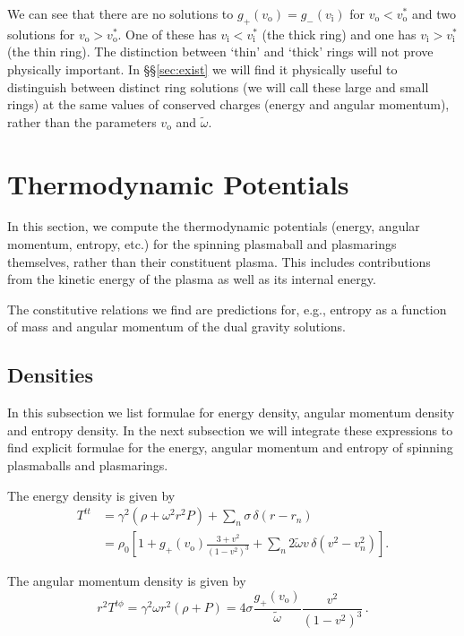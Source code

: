 \documentclass[12pt,a4paper]{article}
\newcommand{\prn}[1]{\left ( #1 \right )}
\newcommand{\brk}[1]{\left [ #1 \right ]}
\newcommand{\rz}{\rho_0}
\newcommand{\vi}{v_\mathrm{i}}
\newcommand{\vo}{v_\mathrm{o}}
\newcommand{\tw}{\widetilde{\omega}}
\begin{document}
We can see that there are no solutions to $g_+(\vo)=g_-(\vi)$ for
$\vo<\vo^*$ and two solutions for $\vo>\vo^*$. One of these has
$\vi<\vi^*$ (the thick ring) and one has $\vi>\vi^*$ (the thin
ring). The distinction between `thin' and `thick' rings will not
prove physically important. In \S\S\ref{sec:exist} we will find it
physically useful to distinguish between distinct ring solutions (we
will call these large and small rings) at the same values of
conserved charges (energy and angular momentum), rather than the
parameters $\vo$ and $\tw$.






\section{Thermodynamic Potentials}\label{sec:charges}

In this section, we compute the thermodynamic potentials (energy,
angular momentum, entropy, etc.) for the spinning plasmaball and
plasmarings themselves, rather than their constituent plasma. This
includes contributions from the kinetic energy of the plasma as well
as its internal energy.

The constitutive relations we find  are predictions for, e.g.,
entropy as a function of mass and angular momentum of the dual
gravity solutions.

\subsection{Densities}\label{sec:chdens}

In this subsection we list formulae for energy density, angular
momentum density and entropy density. In the next subsection we will
integrate these expressions to find explicit formulae for the
energy, angular momentum and entropy of spinning plasmaballs and
plasmarings.

The energy density is given by
%
\begin{equation}\label{Edens:eq}
\begin{split}
  T^{tt} &= \gamma^2 \prn{\rho+\omega^2r^2P}
              + \sum_n \sigma\, \delta(r-r_n) \\
     &= \rz \brk{1+g_+(\vo)\frac{3+v^2}{\prn{1-v^2}^{3}}
                + \sum_n 2\tw v \,\delta(v^2-v^2_n)}.
\end{split}
\end{equation}
%

The angular momentum density is given by
%
\begin{equation}\label{Ldens:eq}
  r^2 T^{t\phi} = \gamma^2\omega r^2 (\rho+P) =
    4\sigma\frac{g_+(\vo)}{\tw}\frac{v^2}{\prn{1-v^2}^{3}}\,.
\end{equation}
%
\end{document}

